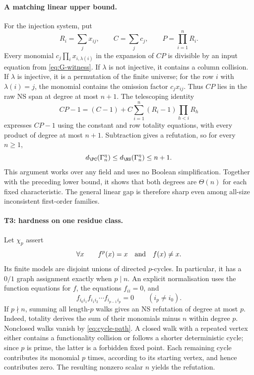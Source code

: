 \paragraph{A matching linear upper bound.}
For the injection system, put
\[
 R_i=\sum_jx_{ij},\qquad C=\sum_jc_j,\qquad P=\prod_{i=1}^nR_i.
\]
Every monomial $c_j\prod_i x_{i,\lambda(i)}$ in the expansion of $CP$
is divisible by an input equation from \eqref{eq:G-witness}. If
$\lambda$ is not injective, it contains a column collision. If
$\lambda$ is injective, it is a permutation of the finite universe;
for the row $i$ with $\lambda(i)=j$, the monomial contains the omission
factor $c_jx_{ij}$. Thus $CP$ lies in the raw NS span at degree at most
$n+1$. The telescoping identity
\[
 CP-1=(C-1)+C\sum_{i=1}^n(R_i-1)\prod_{h<i}R_h
\]
expresses $CP-1$ using the constant and row totality equations, with
every product of degree at most $n+1$. Subtraction gives a refutation,
so for every $n\ge1$,
\[
 d_{\PC}(\Gamma_n^\eta)\le d_{\NS}(\Gamma_n^\eta)\le n+1.
\]
This argument works over any field and uses no Boolean simplification.
Together with the preceding lower bound, it shows that both degrees are
$\Theta(n)$ for each fixed characteristic. The general linear gap is
therefore sharp even among all-size inconsistent first-order families.

\paragraph{T3: hardness on one residue class.}
Let $\chi_p$ assert
\[
 \forall x\qquad f^p(x)=x\quad\hbox{and}\quad f(x)\ne x.
\]
Its finite models are disjoint unions of directed $p$-cycles. In particular,
it has a $0/1$ graph assignment exactly when $p\mid n$. An explicit
normalisation uses the function equations for $f$, the equations $f_{ii}=0$,
and
\begin{equation}\label{eq:cycle-path}
 f_{i_0i_1}f_{i_1i_2}\cdots f_{i_{p-1}i_p}=0
 \qquad(i_p\ne i_0).
\end{equation}
If $p\nmid n$, summing all length-$p$ walks gives an NS refutation of degree
at most $p$. Indeed, totality derives the sum of their monomials minus $n$
within degree $p$. Nonclosed walks vanish by \eqref{eq:cycle-path}.
A closed walk with a repeated vertex either contains a functionality
collision or follows a shorter deterministic cycle; since $p$ is prime,
the latter is a forbidden fixed point. Each remaining cycle contributes its
monomial $p$ times, according to its starting vertex, and hence contributes
zero. The resulting nonzero scalar $n$ yields the refutation.

